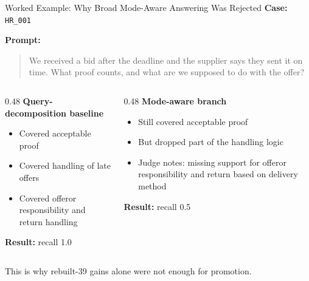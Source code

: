 \documentclass[aspectratio=169]{beamer}
\begin{document}
\begin{frame}{Worked Example: Why Broad Mode-Aware Answering Was Rejected}
  \small
  \textbf{Case:} \texttt{HR\_001}

  \vspace{0.4em}
  \textbf{Prompt:}
  \begin{quote}
    We received a bid after the deadline and the supplier says they sent it on
    time. What proof counts, and what are we supposed to do with the offer?
  \end{quote}

  \begin{columns}[T]
    \begin{column}{0.48\textwidth}
      \textbf{Query-decomposition baseline}
      \begin{itemize}
        \item Covered acceptable proof
        \item Covered handling of late offers
        \item Covered offeror responsibility and return handling
      \end{itemize}

      \vspace{0.3em}
      \textbf{Result:} recall 1.0
    \end{column}
    \begin{column}{0.48\textwidth}
      \textbf{Mode-aware branch}
      \begin{itemize}
        \item Still covered acceptable proof
        \item But dropped part of the handling logic
        \item Judge notes: missing support for offeror responsibility and return based on delivery method
      \end{itemize}

      \vspace{0.3em}
      \textbf{Result:} recall 0.5
    \end{column}
  \end{columns}

  \vspace{0.5em}
  This is why rebuilt-39 gains alone were not enough for promotion.
\end{frame}
\end{document}
